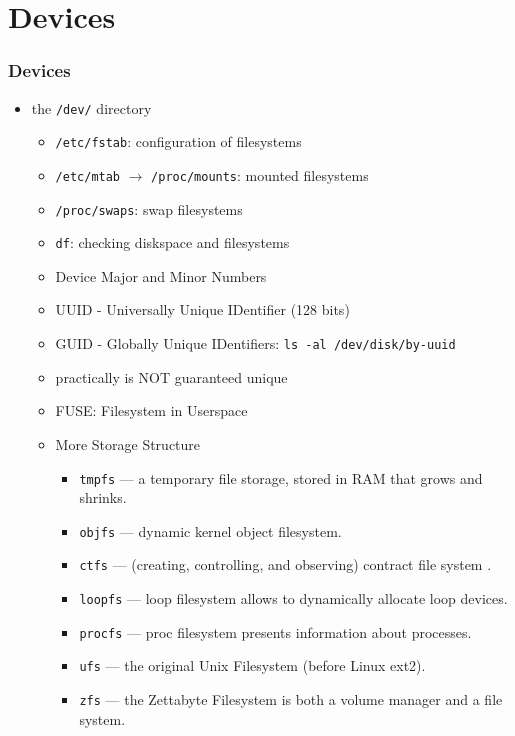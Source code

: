 \documentclass[aspectratio=169, xcolor=table, notheorems, hyperref={pdfpagelabels=false}]{beamer}
\begin{document}
\section{Devices}
\begin{frame}[fragile]
\frametitle{Devices}
\begin{itemize}
\item the \texttt{/dev/} directory
\begin{itemize}
\item \texttt{/etc/fstab}: configuration of filesystems
\item \texttt{/etc/mtab} $\rightarrow$ \texttt{/proc/mounts}: mounted filesystems
\item \texttt{/proc/swaps}: swap filesystems
\item \texttt{df}: checking diskspace and filesystems
\item Device Major and Minor Numbers
\item UUID - Universally Unique IDentifier (128 bits)
\item GUID - Globally Unique IDentifiers: \texttt{ls -al /dev/disk/by-uuid}
\item practically is NOT guaranteed unique
\item FUSE: Filesystem in Userspace
\item More Storage Structure
\begin{itemize}
\item \texttt{tmpfs} --- a temporary file storage, stored in RAM that grows and shrinks.
\item \texttt{objfs} --- dynamic kernel object filesystem.
\item \texttt{ctfs} --- (creating, controlling, and observing) contract file system .
\item \texttt{loopfs} --- loop filesystem allows to dynamically allocate loop devices.
\item \texttt{procfs} --- proc filesystem presents information about processes.
\item \texttt{ufs} --- the original Unix Filesystem (before Linux ext2).
\item \texttt{zfs} --- the Zettabyte Filesystem is  both a volume manager and a file system. 
\end{itemize}
\end{itemize}
\end{itemize}
\end{frame}
\end{document}
